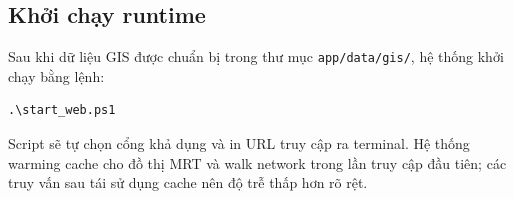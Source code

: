 ﻿\documentclass[../DoAn.tex]{subfiles}
\begin{document}
\subsection{Khởi chạy runtime}
Sau khi dữ liệu GIS được chuẩn bị trong thư mục \texttt{app/data/gis/}, hệ thống khởi chạy bằng lệnh:
\begin{tcolorbox}[
  enhanced,
  title={Đoạn mã: Khởi chạy ứng dụng},
  fonttitle=\bfseries\small,
  colframe=codeframe,
  colback=codeback,
  coltitle=black,
  colbacktitle=codeheader,
  boxrule=0.5mm,
  arc=2mm,
  drop shadow,
  before=\par\vspace{8pt}\needspace{12\baselineskip},
  after=\par\vspace{10pt}
]
\begin{verbatim}
.\start_web.ps1
\end{verbatim}
\end{tcolorbox}
Script sẽ tự chọn cổng khả dụng và in URL truy cập ra terminal. Hệ thống warming cache cho đồ thị MRT và walk network trong lần truy cập đầu tiên; các truy vấn sau tái sử dụng cache nên độ trễ thấp hơn rõ rệt.

\end{document}
